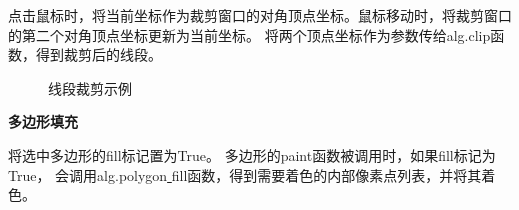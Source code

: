 \documentclass[a4paper,UTF8]{article}
\begin{document}
点击鼠标时，将当前坐标作为裁剪窗口的对角顶点坐标。鼠标移动时，将裁剪窗口的第二个对角顶点坐标更新为当前坐标。
将两个顶点坐标作为参数传给alg.clip函数，得到裁剪后的线段。
\begin{figure}[H]
    \centering
        \caption{线段裁剪示例}
\end{figure}


\textbf{多边形填充}

将选中多边形的fill标记置为True。
多边形的paint函数被调用时，如果fill标记为True，
会调用alg.polygon\underline{ }fill函数，得到需要着色的内部像素点列表，并将其着色。
\end{document}

